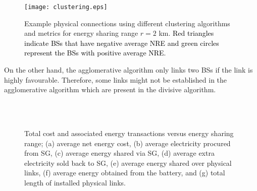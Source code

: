 \documentclass[10pt, letter,twocolumn]{IEEEtran}
\begin{document}
\begin{figure}[t!]
  \centering
  \texttt{[image: clustering.eps]}\vspace{-0.0in}
  \caption{Example physical connections using different clustering algorithms and metrics for energy sharing range $r = 2$ km. \textcolor{black}{Red triangles indicate BSs that have negative average NRE and green circles represent the BSs with positive average NRE.}}\label{clustering_fig}\vspace{-0.0in}
\end{figure}
On the other hand, the agglomerative algorithm only links two BSs if the link is highly favourable. Therefore, some links might not be established in the agglomerative algorithm which are present in the divisive algorithm.
\begin{figure*}[h!]
\addtolength{\subfigcapskip}{-0.0in}
\begin{center}
\
\\
\\
\end{center}
\caption{Total cost and associated energy transactions versus energy sharing range; (a) average net energy cost, (b) average electricity procured from SG, (c) average energy shared via SG, (d) average extra electricity sold back to SG, (e) average energy shared over physical links, (f) average energy obtained from the battery, and (g) total length of installed physical links.}
\label{3}
\end{figure*}
\end{document}
